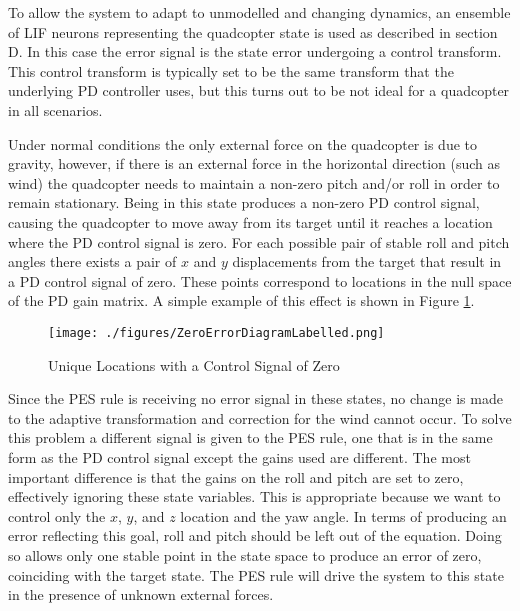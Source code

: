 \documentclass[letterpaper, 10 pt, conference]{ieeeconf}  %
\begin{document}
To allow the system to adapt to unmodelled and changing dynamics, an ensemble of LIF neurons representing the quadcopter state is used as described in section D.
In this case the error signal is the state error undergoing a control transform.
This control transform is typically set to be the same transform that the underlying PD controller uses, but this turns out to be not ideal for a quadcopter in all scenarios.

Under normal conditions the only external force on the quadcopter is due to gravity, however, if there is an external force in the horizontal direction (such as wind) the quadcopter needs to maintain a non-zero pitch and/or roll in order to remain stationary.
Being in this state produces a non-zero PD control signal, causing the quadcopter to move away from its target until it reaches a location where the PD control signal is zero.
For each possible pair of stable roll and pitch angles there exists a pair of $x$ and $y$ displacements from the target that result in a PD control signal of zero.
These points correspond to locations in the null space of the PD gain matrix.
A simple example of this effect is shown in Figure \ref{fig:zeroError}.

\begin{figure}
\centering
\texttt{[image: ./figures/ZeroErrorDiagramLabelled.png]}
\caption{Unique Locations with a Control Signal of Zero}
\label{fig:zeroError}
\end{figure}

Since the PES rule is receiving no error signal in these states, no change is made to the adaptive transformation and correction for the wind cannot occur.
To solve this problem a different signal is given to the PES rule, one that is in the same form as the PD control signal except the gains used are different.
The most important difference is that the gains on the roll and pitch are set to zero, effectively ignoring these state variables.
This is appropriate because we want to control only the $x$, $y$, and $z$ location and the yaw angle.
In terms of producing an error reflecting this goal, roll and pitch should be left out of the equation.
Doing so allows only one stable point in the state space to produce an error of zero, coinciding with the target state.
The PES rule will drive the system to this state in the presence of unknown external forces.
\end{document}
